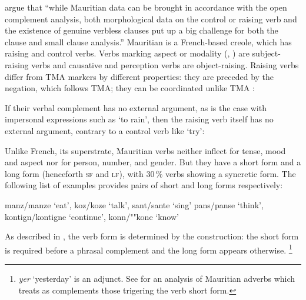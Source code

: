 \documentclass[output=paper
                ,modfonts
                ,nonflat
	        ,collection
	        ,collectionchapter
	        ,collectiontoclongg
 	        ,biblatex
                ,babelshorthands
                ,newtxmath
                ,draftmode
                ,colorlinks, citecolor=brown
]{./langsci/langscibook}
\begin{document}
\citet[]{HenriandLaurens2011} argue that ``while Mauritian data can be brought in accordance with the open complement analysis, both morphological data on the control or raising verb and the existence of genuine verbless clauses put up a big challenge for both the clause and small clause analysis.''
Mauritian is a French-based creole, which has raising and control verbs. Verbs marking aspect or
modality (, ) are subject-raising verbs and causative and perception verbs are
object-raising. Raising verbs differ from TMA markers by different properties: they are preceded by
the negation, which follows TMA; they can be coordinated unlike TMA \citep[]{HenriandLaurens2011}:

\eal
{}
\zl
 
If their verbal complement has no external argument, as is the case with impersonal expressions such as  `to rain', then the raising verb itself has no external argument, contrary to a control verb like  `try':

\eal
{}
\zl

Unlike French, its superstrate, Mauritian verbs neither inflect for tense, mood and aspect nor for person, number, and
gender. But they have a short form and a long form (henceforth \textsc{sf} and \textsc{lf}), with
30\,\% verbs showing a syncretic form. The following list of examples provides pairs of short and
long forms respectively:

\eal
\ex manz/manze `eat', koz/koze `talk', sant/sante `sing'
\ex pans/panse `think', kontign/kontigne `continue', konn/""kone `know'
\zl

As described in \citet{Henri2010}, the verb form is determined by the construction: the short form is required before a phrasal complement and the long form appears otherwise. \footnote{\textit{yer} `yesterday' is an adjunct. See  for an analysis of Mauritian adverbs which treats as complements those trigering the verb short form.}
\end{document}
